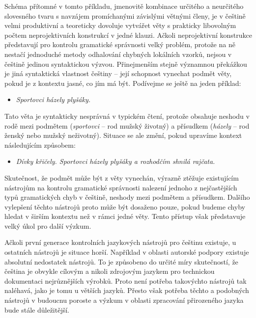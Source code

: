 \begin{multicols}{2}
Schéma přítomné v tomto příkladu, jmenovitě kombinace určitého a neurčitého slovesného tvaru s navzájem promíchanými závislými větnými členy, je v češtině velmi produktivní a teoreticky dovoluje vytvářet věty s prakticky libovolným počtem neprojektivních konstrukcí v jedné klauzi.
Ačkoli neprojektivní konstrukce představují pro kontrolu gramatické správnosti velký problém, protože na ně nestačí jednoduché metody odhalování chybných lokálních vzorků, nejsou v češtině jedinou syntaktickou výzvou. Přinejmenším stejně významnou překážkou je jiná syntaktická vlastnost češtiny – její schopnost vynechat podmět věty, pokud je z kontextu jasné, co jím má být. Podívejme se ještě na jeden příklad:

\begin{itemize}
\item[]\textit{Sportovci házely plyšáky.}
\end{itemize}

Tato věta je syntakticky nesprávná v typickém čtení, protože obsahuje neshodu v rodě mezi podmětem (\textit{sportovci} – rod mužský životný) a přísudkem (\textit{házely} – rod ženský nebo mužský neživotný). Situace se ale změní, pokud upravíme kontext následujícím způsobem:

\begin{itemize}
\item[]\textit{Dívky křičely. Sportovci házely plyšáky a rozhodčím shnilá rajčata.}
\end{itemize}

Skutečnost, že podmět může být z věty vynechán, výrazně ztěžuje existujícím nástrojům na kontrolu gramatické správnosti nalezení jednoho z nejčastějších typů gramatických chyb v češtině, neshody mezi podmětem a přísudkem. Dalšího vylepšení těchto nástrojů proto může být dosaženo pouze, pokud budeme chyby hledat v širším kontextu než v rámci jedné věty. Tento přístup však představuje velký úkol pro další výzkum.

Ačkoli první generace kontrolních jazykových nástrojů pro češtinu existuje, u ostatních nástrojů je situace horší. Například v oblasti autorské podpory existuje absolutní nedostatek nástrojů. To je způsobeno do určité míry skutečností, že čeština je obvykle cílovým a nikoli zdrojovým jazykem pro technickou dokumentaci nejrůznějších výrobků. Proto není potřeba takovýchto nástrojů tak naléhavá, jako je tomu u větších jazyků. Přesto však potřeba těchto a podobných nástrojů v budoucnu poroste a výzkum v oblasti zpracování přirozeného jazyka bude stále důležitější.
  

\end{multicols}
